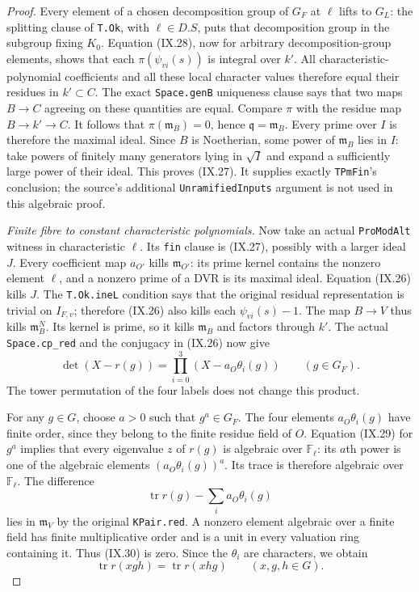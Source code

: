 \begin{proof}
Every element of a chosen decomposition group of
$G_F$ at $\ell$ lifts to $G_L$: the splitting clause
of \texttt{T.Ok}, with $\ell\in D.S$, puts that
decomposition group in the subgroup fixing $K_0$.
Equation (IX.28), now for arbitrary decomposition-group
elements, shows that each $\pi(\psi_{vi}(s))$ is
integral over $k'$.  All characteristic-polynomial
coefficients and all these local character values
therefore equal their residues in $k'\subset C$.
The exact \texttt{Space.genB} uniqueness clause says
that two maps $B\to C$ agreeing on these quantities
are equal.  Compare $\pi$ with the residue map
$B\to k'\to C$.  It follows that
$\pi(\mathfrak m_B)=0$, hence
$\mathfrak q=\mathfrak m_B$.
Every prime over $I$ is therefore the maximal ideal.
Since $B$ is Noetherian, some power of $\mathfrak m_B$
lies in $I$: take powers of finitely many generators
lying in $\sqrt I$ and expand a sufficiently large
power of their ideal.  This proves (IX.27).
It supplies exactly \texttt{TPmFin}'s conclusion;
the source's additional \texttt{UnramifiedInputs}
argument is not used in this algebraic proof.

\emph{Finite fibre to constant characteristic polynomials.}
Now take an actual \texttt{ProModAlt} witness in
characteristic $\ell$.  Its \texttt{fin} clause is
(IX.27), possibly with a larger ideal $J$.
Every coefficient map $a_{O'}$ kills
$\mathfrak m_{O'}$: its prime kernel contains the
nonzero element $\ell$, and a nonzero prime of a DVR
is its maximal ideal.  Equation (IX.26) kills $J$.
The \texttt{T.Ok.ineL} condition says that the original
residual representation is trivial on $I_{F,v}$;
therefore (IX.26) also kills each $\psi_{vi}(s)-1$.
The map $B\to V$ thus kills $\mathfrak m_B^N$.
Its kernel is prime, so it kills $\mathfrak m_B$ and
factors through $k'$.
The actual \texttt{Space.cp\_red} and the conjugacy
in (IX.26) now give
\[
 \det(X-r(g))=\prod_{i=0}^3
       (X-a_O\theta_i(g))\qquad(g\in G_F).
 \tag{IX.29}
\]
The tower permutation of the four labels does not
change this product.

For any $g\in G$, choose $a>0$ such that $g^a\in G_F$.
The four elements $a_O\theta_i(g)$ have finite order,
since they belong to the finite residue field of $O$.
Equation (IX.29) for $g^a$ implies that every eigenvalue
$z$ of $r(g)$ is algebraic over $\mathbb F_\ell$:
its $a$th power is one of the algebraic elements
$(a_O\theta_i(g))^a$.  Its trace is therefore algebraic
over $\mathbb F_\ell$.  The difference
\[
              \operatorname{tr}r(g)
                         -\sum_i a_O\theta_i(g)
 \tag{IX.30}
\]
lies in $\mathfrak m_V$ by the original
\texttt{KPair.red}.  A nonzero element algebraic over
a finite field has finite multiplicative order and
is a unit in every valuation ring containing it.
Thus (IX.30) is zero.  Since the $\theta_i$ are
characters, we obtain
\[
 \operatorname{tr}r(xgh)=\operatorname{tr}r(xhg)
                    \qquad(x,g,h\in G).
 \tag{IX.31}
\]


\end{proof}
